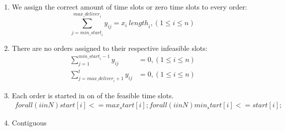 \documentclass{article}
\begin{document}
\begin{enumerate}
     \item We assign the correct amount of time slots or zero time slots to every order:
    \begin{equation}
        \sum^{\mathit{max\_deliver}_i}_{j = \mathit{min\_start}_i} y_{ij} = x_i \: \mathit{length}_i, (1 \leq i \leq n)
    \end{equation}
    \item There are no orders assigned to their respective infeasible slots:
        \begin{align}
	  \sum_{j = 1}^{\mathit{min\_start}_i-1} y_{ij} &= 0, (1 \leq i \leq n) \\
	  \sum_{j = \mathit{max\_deliver}_i+1}^t y_{ij} &= 0, (1 \leq i \leq n)
        \end{align}

        \item Each order is started in on of the feasible time slots.
        \begin{align}
                	forall(i in N)
	  start[i] <= max_start[i];
    forall(i in N)	
	  min_start[i] <= start[i];    
        \end{align}

        \item Contiguous
\end{enumerate}
\end{document}
